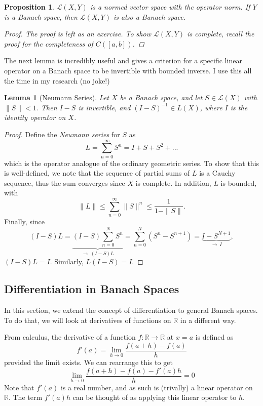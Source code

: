\documentclass[12pt]{amsart}         %
\newtheorem{proposition}{Proposition}[section]
\newtheorem{lemma}{Lemma}[section]
\theoremstyle{remark}
\newcommand{\R}{\mathbb{R}}
\begin{document}
\begin{proposition}
$\mathcal{L}(X, Y)$ is a normed vector space with the operator norm. If $Y$ is a Banach space, then $\mathcal{L}(X, Y)$ is also a Banach space.
\begin{proof}
The proof is left as an exercise. To show $\mathcal{L}(X, Y)$ is complete, recall the proof for the completeness of $C([a,b])$.
\end{proof}
\end{proposition}

The next lemma is incredibly useful and gives a criterion for a specific linear operator on a Banach space to be invertible with bounded inverse. I use this all the time in my research (no joke!)

\begin{lemma}[Neumann Series]
Let $X$ be a Banach space, and let $S \in \mathcal{L}(X)$ with $\|S\| < 1$. Then $I - S$ is invertible, and $(I - S)^{-1} \in L(X)$, where $I$ is the identity operator on $X$.
\end{lemma}

\begin{proof}
Define the \emph{Neumann series} for $S$ as 
\[
L = \sum_{n=0}^{\infty} S^n = I + S + S^2 + ... 
\]
which is the operator analogue of the ordinary geometric series. To show that this is well-defined, we note that the sequence of partial sums of $L$ is a Cauchy sequence, thus the sum converges since $X$ is complete. In addition, $L$ is bounded,
with
\[
\|L\| \leq \sum_{n=0}^\infty \|S\|^n \leq \frac{1}{1 - \|S\|}.
\]
Finally, since
\[(I - S)L = \underbrace{(I - S) \sum_{n=0}^{N} S^n}_{\rightarrow \: (I-S)L} = \sum_{n=0}^N (S^n - S^{n+1}) = 
\underbrace{I - S^{N+1}}_{\rightarrow \: I},
\]
$(I-S)L = I$. Similarly, $L(I - S) = I$.
\end{proof}

\subsection{Differentiation in Banach Spaces}

In this section, we extend the concept of differentiation to general Banach spaces. To do that, we will look at derivatives of functions on $\R$ in a different way.

From calculus, the derivative of a function $f: \R \rightarrow \R$ at $x = a$ is defined as 
\[
f'(a) = \lim_{h \rightarrow 0}\frac{f(a + h) - f(a)}{h}
\]
provided the limit exists. We can rearrange this to get
\[
\lim_{h \rightarrow 0}\frac{f(a + h) - f(a) - f'(a) h }{h} = 0
\]
Note that $f'(a)$ is a real number, and as such is (trivally) a linear operator on $\R$. The term $f'(a) h$ can be thought of as applying this linear operator to $h$.
\end{document}
